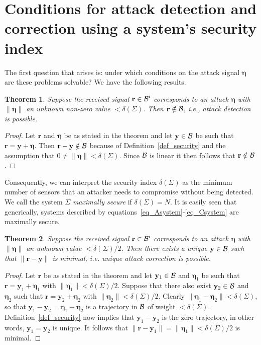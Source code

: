 \documentclass[letterpaper, 10 pt, conference]{ieeeconf}
\newcommand{\B}{{\cal B}}
\newcommand{\ybold}{\mathbf{y}}
\newcommand{\etabold}{\mathbf{\boldsymbol{\eta}}}
\newcommand{\rbold}{\mathbf{r}}
\newtheorem{thm}{Theorem}[section]
\begin{document}
\section{Conditions for attack detection and correction using a system's security index}
The first question that arises is: under which conditions on the attack signal $\etabold$ are these problems solvable? We have the following results. 

\begin{thm}\label{thm_detect}
Suppose the received signal $\rbold \in \B'$ corresponds to an attack $\etabold$ with $\|\etabold\| $ an unknown non-zero value $< \delta (\Sigma  )$. Then $\rbold \notin \B$, i.e., attack detection is possible. 
\end{thm}
\begin{proof}
Let $\rbold$ and $\etabold$ be as stated in the theorem and let $\ybold \in \B$ be such that $\rbold = \ybold + \etabold$. Then $\rbold - \ybold \notin \B$ because of Definition~\ref{def_security} and the assumption that $0 \neq \|\etabold\| < \delta (\Sigma  )$. Since $\B$ is linear it then follows that $\rbold \notin \B$.	
\end{proof}

Consequently, we can interpret the security index $\delta (\Sigma  )$ as the minimum number of sensors that an attacker needs to compromise without being detected. We call the system $\Sigma $ {\em maximally secure} if $\delta (\Sigma  ) = N$. It is easily seen that generically, systems described by equations~\eqref{eq_Asystem}-\eqref{eq_Csystem} are maximally secure.

\begin{thm}\label{thm_correct}
Suppose the received signal $\rbold \in \B'$ corresponds to an attack $\etabold$ with $\|\etabold\| $ an unknown value $< \delta (\Sigma  )/2$. Then there exists a unique $\ybold \in \B$ such that $\|\rbold - \ybold\| $ is minimal, i.e. unique attack correction is possible.   
\end{thm}
\begin{proof}
		Let $\rbold$ be as stated in the theorem and let $\ybold_1 \in \B$ and $\etabold_1$ be such that $\rbold = \ybold_1 + \etabold_1$ with $\|\etabold_1 \| < \delta (\Sigma  )/2$. Suppose that there also exist $\ybold_2 \in \B$ and $\etabold_2$ such that $\rbold = \ybold_2 + \etabold_2$ with $\|\etabold_2 \| < \delta (\Sigma  )/2$. Clearly $\|\etabold_1 - \etabold_2\| < \delta (\Sigma  )$, so that $\ybold_1 - \ybold_2 = \etabold_1 - \etabold_2$ is a trajectory in $\B$ of weight $< \delta (\Sigma  )$. Definition~\ref{def_security} now implies that 
		$\ybold_1 - \ybold_2$ is the zero trajectory, in other words, $\ybold_1 =\ybold_2$ is unique.  It follows that $\|\rbold - \ybold_1\| = \|\etabold_1 \| < \delta (\Sigma  )/2$ is minimal.
\end{proof}
\end{document}
